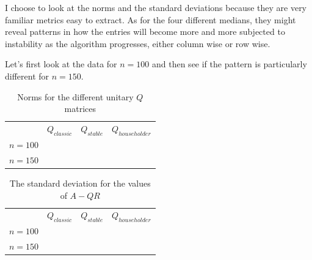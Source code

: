 \documentclass[a4paper,11pt]{article}
\begin{document}
I choose to look at the norms and the standard deviations because they
are very familiar metrics easy to extract. As for the four different
medians, they might reveal patterns in how the entries will
become more and more subjected to instability as the algorithm
progresses, either column wise or row wise.

Let's first look at the data for $n=100$ and then see if
the pattern is particularly different for $n=150$.

\begin{table}[h]
  \begin{tabular}{r|c|c|c|}
    \multicolumn{1}{r}{}
     & \multicolumn{1}{c}{$Q_{classic}$ }
     & \multicolumn{1}{c}{$Q_{stable}$}
     & \multicolumn{1}{c}{$Q_{householder}$} \\
    \cline{2-4}
    $n=100$ & 
            & 
            & 
            \\ \cline{2-4}
    $n=150$ & 
            & 
            & 
            \\ \cline{2-4}
  \end{tabular}
  \caption{Norms for the different unitary $Q$ matrices}
  \label{tab:norms}
\end{table}

\begin{table}[h]
  \begin{tabular}{r|c|c|c|}
    \multicolumn{1}{r}{}
     & \multicolumn{1}{c}{$Q_{classic}$ }
     & \multicolumn{1}{c}{$Q_{stable}$}
     & \multicolumn{1}{c}{$Q_{householder}$} \\
    \cline{2-4}
    $n=100$ & 
            & 
            & 
            \\ \cline{2-4}
    $n=150$ & 
            & 
            & 
            \\ \cline{2-4}
  \end{tabular}
  \caption{The standard deviation for the values of $A-QR$}
  \label{tab:stds}
\end{table}

\newcommand{\genfig}[3] {{
    \begin{figure}
            \centering
            \begin{subfigure}[b]{1.0\textwidth}
                    \texttt{[image: fig/\#1-\#2-100]}
                    \caption{$n = 100$}
            \end{subfigure}
            \begin{subfigure}[b]{1.0\textwidth}
                    \texttt{[image: fig/\#1-\#2-150]}
                    \caption{$n = 150$}
            \end{subfigure}
            \caption{Medians of the columns of $\Delta #2$ #3}\label{fig:#1-#2}
    \end{figure}
  }}
\end{document}
